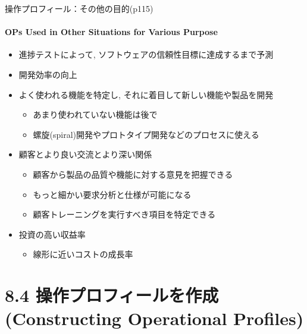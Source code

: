 \begin{frame}{操作プロフィール：その他の目的(p115)}
\framesubtitle{OPs Used in Other Situations for Various Purpose}
\begin{itemize}
\item<+-> 進捗テストによって, ソフトウェアの信頼性目標に達成するまで予測
\item<+-> 開発効率の向上
\item<+-> よく使われる機能を特定し, それに着目して新しい機能や製品を開発
    \begin{itemize}
    \item あまり使われていない機能は後で
    \item 螺旋(spiral)開発やプロトタイプ開発などのプロセスに使える
    \end{itemize}
\item<+-> 顧客とより良い交流とより深い関係
    \begin{itemize}
    \item 顧客から製品の品質や機能に対する意見を把握できる
    \item もっと細かい要求分析と仕様が可能になる
    \item 顧客トレーニングを実行すべき項目を特定できる
    \end{itemize}
\item<+-> 投資の高い収益率
    \begin{itemize}
    \item 線形に近いコストの成長率
    \end{itemize}
\end{itemize}
\end{frame}
\section{8.4 操作プロフィールを作成(Constructing Operational Profiles)}
